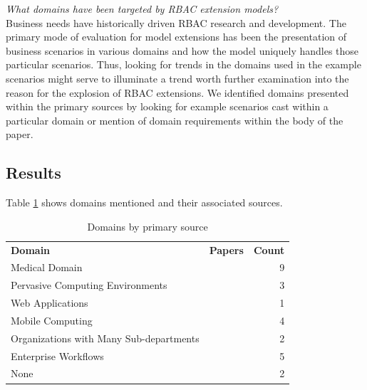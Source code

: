 \textit{What domains have been targeted by RBAC extension models?}
\\

Business needs have historically driven RBAC research and development.  The primary mode of evaluation for
model extensions has been the presentation of business scenarios in various domains and how the model
uniquely handles those particular scenarios.  Thus, looking for trends in the domains used in the example
scenarios might serve to illuminate a trend worth further examination into the reason for the explosion of
RBAC extensions.  We identified domains presented within the primary sources by looking for example
scenarios cast within a particular domain or mention of domain requirements within the body of the paper.

\subsection{Results}

Table \ref{tab:domains} shows domains mentioned and their associated sources.

\begin{table}
\centering
\caption{Domains by primary source}
\vspace{0.1 in}
\begin{tabular*}{.9\linewidth}{| p{.45\linewidth} | p{.3\linewidth} | r | }
\cline{1-3}

\textbf{Domain} & \textbf{Papers} & \textbf{Count} \\ \cline{1-3}
Medical Domain
&
\cite{ni2010privacy}
\cite{motta03:contextual}
\cite{aich09:role}
\cite{zhou2007team}
\cite{alam06:constraint}
\cite{tzelepi01:flexible}
\cite{damiani2007geo}
\cite{hansen2003spatial}
\cite{samuel07:spatio-temporal}

&
9 \\ \cline{1-3}
Pervasive Computing Environments
& 
\cite{huang06:pervasive}
\cite{ray07:spatio}
\cite{chen08:spatio-temporal}
&
3 \\ \cline{1-3}
Web Applications
&
\cite{haibo05:context} 
\cite{masoumzadeh2008purbac}
&
1 \\ \cline{1-3}
Mobile Computing
&
\cite{aich09:role} 
\cite{thein2011leveraging}
\cite{zou2009crbac}
\cite{ray2006lrbac}
\cite{chandran05:llt}
&
4 \\ \cline{1-3}
Organizations with Many Sub-departments
&
\cite{yao2008task} 
\cite{yamazaki04:designing}
&
2 \\ \cline{1-3}
Enterprise Workflows
&
\cite{cholewka00:acontext-sensitive}
\cite{bao08:role}
\cite{zhang06:collaborative}
\cite{oh2003task}
\cite{joshi05:generalized}
&
5 \\ \cline{1-3}
None
&
\cite{jian2008extended}
\cite{aich07:STARBAC}
&
2 \\ \cline{1-3}

\end{tabular*}
\label{tab:domains}
\end{table}

